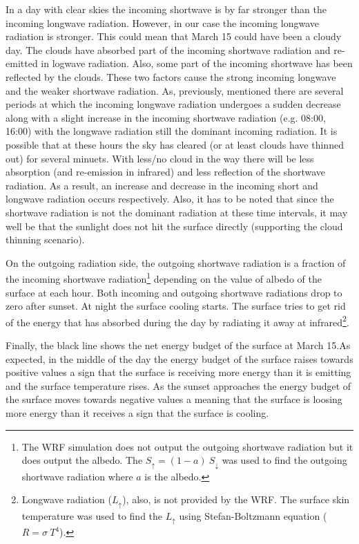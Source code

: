 \documentclass[a4paper,12pt]{article}
\numberwithin{equation}{section} %
\begin{document}
In a day with clear skies the incoming shortwave is by far stronger than the incoming longwave radiation. However, in our case the incoming longwave radiation is stronger. This could mean that March 15 could have been a cloudy day. The clouds have absorbed part of the incoming shortwave radiation and re-emitted in logwave radiation. Also, some part of the incoming shortwave has been reflected by the clouds. These two factors cause the strong incoming longwave and the weaker shortwave radiation. As, previously, mentioned there are several periods at which the incoming longwave radiation undergoes a sudden decrease along with a slight increase in the incoming shortwave radiation (e.g. 08:00, 16:00) with the longwave radiation still the dominant incoming radiation. It is possible that at these hours the sky has cleared (or at least clouds have thinned out) for several minuets. With less/no cloud in the way there will be less absorption (and re-emission in infrared) and less reflection of the shortwave radiation. As a result, an increase and decrease in the incoming short and longwave radiation occurs respectively. Also, it has to be noted that since the shortwave radiation is not the dominant radiation at these time intervals, it may well be that the sunlight does not hit the surface directly (supporting the cloud thinning scenario).

On the outgoing radiation side, the outgoing shortwave radiation is a fraction of the incoming shortwave radiation\footnote[56]{The WRF simulation does not output the outgoing shortwave radiation but it does output the albedo. The $S_{\uparrow} = (1 - a)\: S_{\downarrow}$ was used to find the outgoing shortwave radiation where $a$ is the albedo.} depending on the value of albedo of the surface at each hour. Both incoming and outgoing shortwave radiations drop to zero after sunset. At night the surface cooling starts. The surface tries to get rid of the energy that has absorbed during the day by radiating it away at infrared\footnote{Longwave radiation ($L_{\uparrow}$), also, is not provided by the WRF. The surface skin temperature was used to find the $L_{\uparrow}$ using Stefan-Boltzmann equation ($R = \sigma \: T^4$).}. 

Finally, the black line shows the net energy budget of the surface at March 15.As expected, in the middle of the day the energy budget of the surface raises towards positive values a sign that the surface is receiving more energy than it is emitting and the surface temperature rises. As the sunset approaches the energy budget of the surface moves towards negative values a meaning that the surface is loosing more energy than it receives a sign that the surface is cooling.
\end{document}
